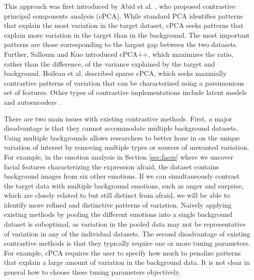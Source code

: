 \documentclass[12pt]{article}
\begin{document}
This approach was first introduced by Abid et al. \cite{Abid}, who proposed contrastive principal components analysis (cPCA). While standard PCA identifies patterns that explain the most variation in the target dataset, cPCA seeks patterns that explain more variation in the target than in the background. The most important patterns are those corresponding to the largest gap between the two datasets. Further, Salloum and Kuo \cite{Salloum} introduced cPCA++, which maximizes the ratio, rather than the difference, of the variance explained by the target and background. Boileau et al. \cite{Boileau} described sparse cPCA, which seeks maxmially contrastive patterns of variation that can be characterized using a parsimonious set of features. Other types of contrastive implementations include latent models \cite{severson2019unsupervised} and autoencoders \cite{cautoencoder}.

There are two main issues with existing contrastive methods. First, a major disadvantage is that they cannot accommodate multiple background datasets. Using multiple backgrounds allows researchers to better hone in on the unique variation of interest by removing multiple types or sources of unwanted variation.
For example, in the emotion analysis in Section \ref{sec:faces} where we uncover facial features characterizing the expression afraid, the dataset contains background images from six other emotions. If we can simultaneously contrast the target data with multiple background emotions, such as anger and surprise, which are closely related to but still distinct from afraid, we will be able to identify more refined and distinctive patterns of variation. Naively applying existing methods by pooling the different emotions into a single background dataset is suboptimal, as variation in the pooled data may not be representative of variation in any of the individual datasets. The second disadvantage of existing contrastive methods is that they typically require one or more tuning parameters. For example, cPCA requires the user to specify how much to penalize patterns that explain a large amount of variation in the background data. It is not clear in general how to choose these tuning parameters objectively.
\end{document}
